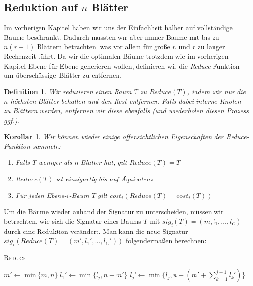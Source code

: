 \documentclass[a4paper,10pt,ngerman]{scrartcl}
\newtheorem{definition}[satz]{Definition}
\newtheorem{korollar}[satz]{Korollar}
\begin{document}
    \subsection{Reduktion auf $n$ Blätter} %
    Im vorherigen Kapitel haben wir uns der Einfachheit halber auf vollständige Bäume beschränkt.
    Dadurch mussten wir aber immer Bäume mit bis zu $n(r - 1)$ Blättern betrachten, was vor allem für große $n$ und $r$ zu langer Rechenzeit führt.
    Da wir die optimalen Bäume trotzdem wie im vorherigen Kapitel Ebene für Ebene generieren wollen, definieren wir die \textit{Reduce}-Funktion um \glqq überschüssige\grqq~Blätter zu entfernen.
    \begin{definition}
        Wir reduzieren einen Baum $T$ zu $Reduce(T)$, indem wir nur die $n$ höchsten Blätter behalten und den Rest entfernen.
        Falls dabei interne Knoten zu Blättern werden, entfernen wir diese ebenfalls (und wiederholen diesen Prozess ggf.).
    \end{definition}
    \begin{korollar}
        Wir können wieder einige offensichtlichen Eigenschaften der \textit{Reduce}-Funktion sammeln:
        \begin{enumerate}
            \item Falls $T$ weniger als $n$ Blätter hat, gilt $Reduce(T) = T$
            \item $Reduce(T)$ ist einzigartig bis auf Äquivalenz
            \item Für jeden Ebene-$i$-Baum $T$ gilt $cost_i(Reduce(T) = cost_i(T))$
        \end{enumerate}
    \end{korollar}
    Um die Bäume wieder anhand der Signatur zu unterscheiden, müssen wir betrachten, wie sich die Signatur eines Baums $T$ mit $sig_i(T) = (m, l_1, \dots, l_C)$ durch eine Reduktion verändert.
    Man kann die neue Signatur $sig_i(Reduce(T) = (m', l_1', \dots, l_C'))$ folgendermaßen berechnen: \\
    \begin{algorithm} [H]
        \caption{\textsc{Reduce}}
        \label{alg:reduce}
        \begin{algorithmic}[1]
            \State $m' \gets \min\{m, n\}$
            \State $l_1' \gets \min\{l_j, n - m'\}$
                \State $l_j' \gets \min\{l_j, n - (m' + \sum^{j-1}_{k=1}l_k')\}$
            \EndFor
        \end{algorithmic}
    \end{algorithm}
\end{document}
